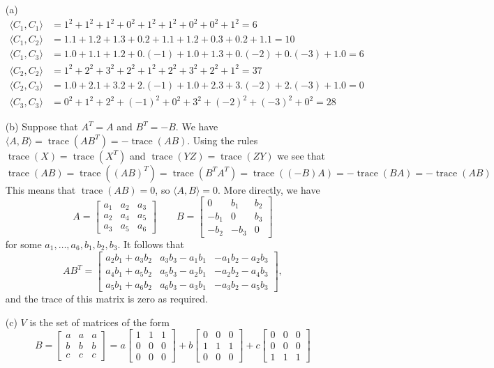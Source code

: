 \documentclass{amsart}
\newcommand{\trc}       {\operatorname{trace}}
\newcommand{\bsm}       {\left[\begin{smallmatrix}}
\newcommand{\esm}       {\end{smallmatrix}\right]}
\newcommand{\ip}[1]     {\langle #1\rangle}
\renewcommand{\:}       {\colon}
\theoremstyle{definition}
\renewenvironment{solution}{\SolutionAtEnd}{\endSolutionAtEnd}
\begin{document}
\begin{solution}
 \begin{itemize}
  \item[(a)] 
   \begin{align*}
    \ip{C_1,C_1} &= 1^2+1^2+1^2+0^2+1^2+1^2+0^2+0^2+1^2 = 6 \\
    \ip{C_1,C_2} &= 1.1+1.2+1.3+0.2+1.1+1.2+0.3+0.2+1.1 = 10 \\
    \ip{C_1,C_3} &= 1.0+1.1+1.2+0.(-1)+1.0+1.3+0.(-2)+0.(-3)+1.0 = 6 \\
    \ip{C_2,C_2} &= 1^2+2^2+3^2+2^2+1^2+2^2+3^2+2^2+1^2 = 37 \\
    \ip{C_2,C_3} &= 1.0+2.1+3.2+2.(-1)+1.0+2.3+3.(-2)+2.(-3)+1.0 = 0 \\
    \ip{C_3,C_3} &= 0^2+1^2+2^2+(-1)^2+0^2+3^2+(-2)^2+(-3)^2+0^2 = 28
   \end{align*}
  \item[(b)] Suppose that $A^T=A$ and $B^T=-B$.  We have
   $\ip{A,B}=\trc(AB^T)=-\trc(AB)$.  Using the rules
   $\trc(X)=\trc(X^T)$ and $\trc(YZ)=\trc(ZY)$ we see that
   \[ \trc(AB)=\trc((AB)^T)=\trc(B^TA^T)=
      \trc((-B)A)=-\trc(BA)=-\trc(AB)
   \]
   This means that $\trc(AB)=0$, so $\ip{A,B}=0$.  More
   directly, we have
   {\tiny \[
     A=\bsm a_1&a_2&a_3\\ a_2&a_4&a_5\\ a_3&a_5&a_6\esm
     \hspace{2em}
     B=\bsm 0&b_1&b_2 \\ -b_1&0&b_3 \\ -b_2&-b_3&0\esm
    \]} 
   for some $a_1,\dotsc,a_6,b_1,b_2,b_3$.  It follows that 
   {\tiny \[ AB^T=\bsm
     a_2b_1+a_3b_2 & a_3b_3-a_1b_1 & -a_1b_2-a_2b_3 \\
     a_4b_1+a_5b_2 & a_5b_3-a_2b_1 & -a_2b_2-a_4b_3 \\
     a_5b_1+a_6b_2 & a_6b_3-a_3b_1 & -a_3b_2-a_5b_3
   \esm, \]}
   and the trace of this matrix is zero as required.
  \item[(c)] $V$ is the set of matrices of the form 
   {\tiny \[
     B = \bsm a & a & a \\ b & b & b \\ c & c & c \esm
       = a \bsm 1&1&1\\0&0&0\\0&0&0\esm + 
         b \bsm 0&0&0\\1&1&1\\0&0&0\esm +
         c \bsm 0&0&0\\0&0&0\\1&1&1\esm
\]}
\end{itemize}
\end{solution}
\end{document}
